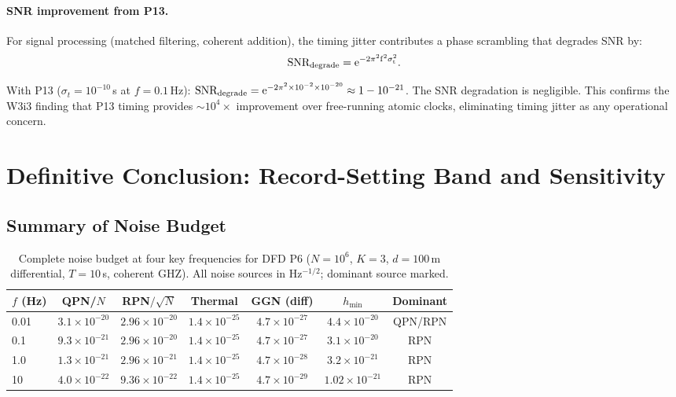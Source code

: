 \documentclass[11pt]{article}
\theoremstyle{definition}
\theoremstyle{remark}
\newcommand{\ee}[1]{\times10^{#1}}
\begin{document}
\paragraph{SNR improvement from P13.}
For signal processing (matched filtering, coherent addition), the timing
jitter contributes a phase scrambling that degrades SNR by:
\begin{equation}
\rm SNR_{degrade} = e^{-2\pi^2 f^2 \sigma_t^2}.
\end{equation}

With P13 ($\sigma_t = 10^{-10}$\,s at $f = 0.1$\,Hz):
$\rm SNR_{degrade} = e^{-2\pi^2 \times 10^{-2} \times 10^{-20}} \approx 1 - 10^{-21}$.
The SNR degradation is negligible.  This confirms the W3i3 finding that
P13 timing provides $\sim 10^4\times$ improvement over free-running
atomic clocks, eliminating timing jitter as any operational concern.

\section{Definitive Conclusion: Record-Setting Band and Sensitivity}
\label{sec:conclusion}

\subsection{Summary of Noise Budget}

\begin{table}[h]
\centering
\caption{Complete noise budget at four key frequencies for DFD P6
($N=10^6$, $K=3$, $d=100$\,m differential, $T=10$\,s, coherent GHZ).
All noise sources in Hz$^{-1/2}$; dominant source marked.}
\label{tab:final-budget}
\begin{tabular}{@{}lcccccc@{}}
\toprule
$f$ (Hz) & QPN/$N$ & RPN$/\sqrt{N}$ & Thermal & GGN (diff) & $h_{\min}$ & Dominant \\
\midrule
0.01 & $3.1\ee{-20}$ & $2.96\ee{-20}$ & $1.4\ee{-25}$ & $4.7\ee{-27}$ & $4.4\ee{-20}$ & QPN/RPN \\
0.1  & $9.3\ee{-21}$ & $2.96\ee{-20}$ & $1.4\ee{-25}$ & $4.7\ee{-27}$ & $3.1\ee{-20}$ & RPN \\
1.0  & $1.3\ee{-21}$ & $2.96\ee{-21}$ & $1.4\ee{-25}$ & $4.7\ee{-28}$ & $3.2\ee{-21}$ & RPN \\
10   & $4.0\ee{-22}$ & $9.36\ee{-22}$ & $1.4\ee{-25}$ & $4.7\ee{-29}$ & $1.02\ee{-21}$ & RPN \\
\bottomrule
\end{tabular}
\end{table}
\end{document}
